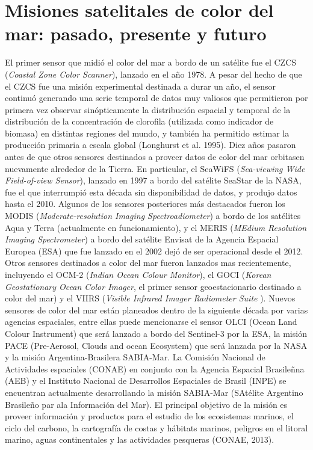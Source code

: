 \section{Misiones satelitales de color del mar: pasado, presente y futuro}

El primer sensor que midió el color del mar a bordo de un satélite fue el CZCS (\textit{Coastal Zone Color Scanner}), lanzado en el año 1978. A pesar del hecho de que el CZCS fue una misión experimental destinada a durar un año, el sensor continuó generando una serie temporal de datos muy valiosos que permitieron por primera vez observar sinópticamente la distribución espacial y temporal de la distribución de la concentración de clorofila (utilizada como indicador de biomasa) en distintas regiones del mundo, y también ha permitido estimar la producción primaria a escala global (Longhurst et al. 1995). Diez años pasaron antes de que otros sensores destinados a proveer datos de color del mar orbitasen nuevamente alrededor de la Tierra. En particular, el SeaWiFS (\textit{Sea-viewing Wide Field-of-view Sensor}), lanzado en 1997 a bordo del satélite SeaStar de la NASA, fue el que interrumpió esta década sin disponibilidad de datos, y produjo datos hasta el 2010. Algunos de los sensores posteriores más destacados fueron los MODIS (\textit{Moderate-resolution Imaging Spectroadiometer}) a bordo de los satélites Aqua y Terra (actualmente en funcionamiento), y el MERIS (\textit{MEdium Resolution Imaging Spectrometer}) a bordo del satélite Envisat de la Agencia Espacial Europea (ESA) que fue lanzado en el 2002 dejó de ser operacional desde el 2012. Otros sensores destinados a color del mar fueron lanzados mas recientemente, incluyendo el OCM-2 (\textit{Indian Ocean Colour Monitor}), el GOCI (\textit{Korean Geostationary Ocean Color Imager}, el primer sensor geoestacionario destinado a color del mar) y el VIIRS (\textit{Visible Infrared Imager Radiometer Suite }). Nuevos sensores de color del mar están planeados dentro de la siguiente década por varias agencias espaciales, entre ellas puede mencionarse el sensor OLCI (Ocean Land Colour Instrument) que será lanzado a bordo del Sentinel-3 por la ESA, la misión PACE (Pre-Aerosol, Clouds and ocean Ecosystem) que será lanzada por la NASA y la misión Argentina-Brasilera SABIA-Mar.
La Comisión Nacional de Actividades espaciales (CONAE) en conjunto con la Agencia Espacial Brasileñna (AEB) y el Instituto Nacional de Desarrollos Espaciales de Brasil (INPE) se encuentran actualmente desarrollando la misión SABIA-Mar (SAtélite Argentino Brasileño par ala Información del Mar). El principal objetivo de la misión es proveer información y productos para el estudio de los ecosistemas marinos, el ciclo del carbono, la cartografía de costas y hábitats marinos, peligros en el litoral marino, aguas continentales y las actividades pesqueras (CONAE, 2013). 
